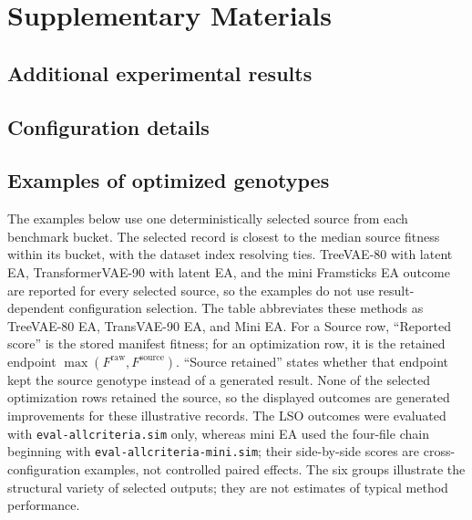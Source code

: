 \chapter{Supplementary Materials}

\section{Additional experimental results}


\section{Configuration details}


\section{Examples of optimized genotypes}

The examples below use one deterministically selected source from each benchmark bucket. The selected record is closest to the median source fitness within its bucket, with the dataset index resolving ties. TreeVAE-80 with latent EA, TransformerVAE-90 with latent EA, and the mini Framsticks EA outcome are reported for every selected source, so the examples do not use result-dependent configuration selection. The table abbreviates these methods as TreeVAE-80 EA, TransVAE-90 EA, and Mini EA. For a Source row, ``Reported score'' is the stored manifest fitness; for an optimization row, it is the retained endpoint $\max(F^{\mathrm{raw}},F^{\mathrm{source}})$. ``Source retained'' states whether that endpoint kept the source genotype instead of a generated result. None of the selected optimization rows retained the source, so the displayed outcomes are generated improvements for these illustrative records. The LSO outcomes were evaluated with \texttt{eval-allcriteria.sim} only, whereas mini EA used the four-file chain beginning with \texttt{eval-allcriteria-mini.sim}; their side-by-side scores are cross-configuration examples, not controlled paired effects. The six groups illustrate the structural variety of selected outputs; they are not estimates of typical method performance.


